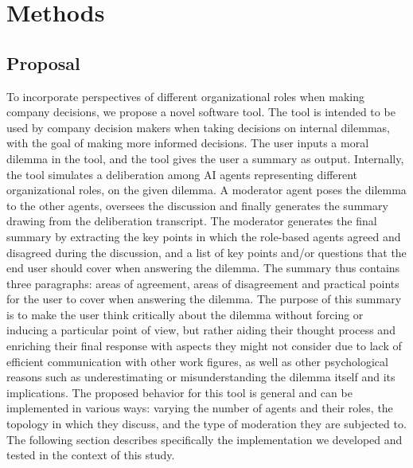 \section{Methods}

\subsection{Proposal}
\label{sec:proposal}

To incorporate perspectives of different organizational roles when making company decisions,
we propose a novel software tool.
The tool is intended to be used by company decision makers when taking decisions on internal dilemmas,
with the goal of making more informed decisions.
The user inputs a moral dilemma in the tool, and the tool gives the user a summary as output.
Internally, the tool simulates a deliberation among AI agents representing different organizational roles, on the given dilemma.
A moderator agent poses the dilemma to the other agents, oversees the discussion and finally generates the summary drawing from the deliberation transcript.
The moderator generates the final summary by extracting the key points in which the role-based agents agreed and disagreed during the discussion,
and a list of key points and/or questions that the end user should cover when answering the dilemma.
The summary thus contains three paragraphs: areas of agreement, areas of disagreement and practical points for the user to cover when answering the dilemma.
The purpose of this summary is to make the user think critically about the dilemma
without forcing or inducing a particular point of view,
but rather aiding their thought process and enriching their final response
with aspects they might not consider due to lack of efficient communication with other work figures,
as well as other psychological reasons such as underestimating or misunderstanding the dilemma itself and its implications.
The proposed behavior for this tool is general and can be implemented in various ways: varying the number of agents and their roles, the topology in which they discuss, and the type of moderation they are subjected to.
The following section describes specifically the implementation we developed and tested in the context of this study.


